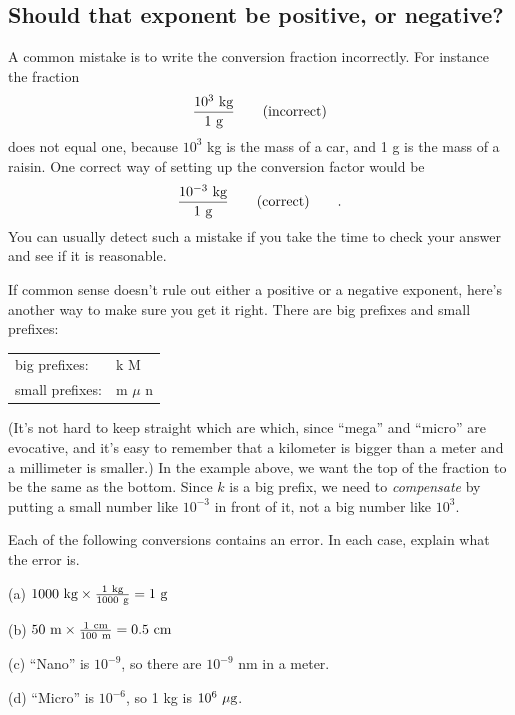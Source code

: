 \subsection{Should that exponent be positive, or negative?}

A common mistake is to write the conversion fraction
incorrectly. For instance the fraction
\begin{equation*}
  \frac{10^3\ \kgunit}{1\ \gunit} \qquad \text{(incorrect)}
\end{equation*}
does not equal one, because $10^3$  kg is the mass of a car,
and 1 g is the mass of a raisin. One correct way of
setting up the conversion factor would be
\begin{equation*}
  \frac{10^{-3}\ \textup{kg}}{1\ \textup{g}} \qquad \text{(correct)} \qquad .
\end{equation*}
You can usually detect such a mistake if you take the time
to check your answer and see if it is reasonable.

If common sense doesn't rule out either a positive or a
negative exponent, here's another way to make sure you get
it right. There are big prefixes and small prefixes:
\begin{center}
\begin{tabular}{ll}
    big prefixes:    & k \quad    M \\
    small prefixes:  &  m  \quad  $\mu$  \quad   n \\
\end{tabular}
\end{center}

\noindent (It's not hard to keep straight which are which, since
``mega'' and ``micro'' are evocative, and it's easy to
remember that a kilometer is bigger than a meter and a
millimeter is smaller.) In the example above, we want the
top of the fraction to be the same as the bottom. Since $k$
is a big prefix, we need to \emph{compensate} by putting a
small number like $10^{-3}$  in front of it, not a big
number like $10^3$.

\begin{exmp}
Each of the following conversions contains an error.  In
each case, explain what the error is.

(a) $1000\ \kgunit \times \frac{1\ \kgunit}{1000\ \gunit}  = 1\ \gunit$

(b) $50\ \munit \times \frac{1\ \zu{cm}}{100\ \munit}    =  0.5\ \zu{cm}$

(c) ``Nano'' is $10^{-9}$, so there are $10^{-9}$  nm in a meter.

(d) ``Micro'' is $10^{-6}$, so 1 kg is $10^6\ \mu\textup{g}$.

\end{exmp}
\divider
\vspace{2mm}


